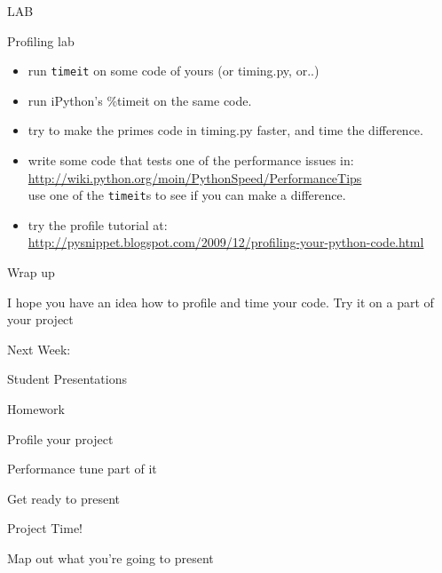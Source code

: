 \documentclass{beamer}
\begin{document}
\begin{frame}[fragile]{LAB}

{\Large Profiling lab}
\begin{itemize}
  \item run \verb|timeit| on some code of yours (or timing.py, or..)
  \item run iPython's \%timeit on the same code.
  \item try to make the primes code in timing.py faster, and time the difference.
  \item write some code that tests one of the performance issues in:\\
        {\small \url{http://wiki.python.org/moin/PythonSpeed/PerformanceTips} }\\
        use one of the \verb|timeit|s to see if you can make a difference.
  \item try the profile tutorial at:\\
        {\small \url{http://pysnippet.blogspot.com/2009/12/profiling-your-python-code.html} }
\end{itemize}

\end{frame}


\begin{frame}[fragile]{Wrap up}

\vfill
{\Large I hope you have an idea how to profile and time your code.}
\vfill
{\Large Try it on a part of your project}
\vfill

\end{frame}

\begin{frame}{Next Week:}

\vfill
{\LARGE Student Presentations}


\vfill

\end{frame}

\begin{frame}[fragile]{Homework}

\vfill
\Large{Profile your project}

\vfill
\Large{Performance tune part of it}

\vfill
\Large{Get ready to present}

\vfill

\end{frame}

\begin{frame}[fragile]{Project Time!}

\vfill
\Large{Map out what you're going to present}
\vfill

\end{frame}
\end{document}
